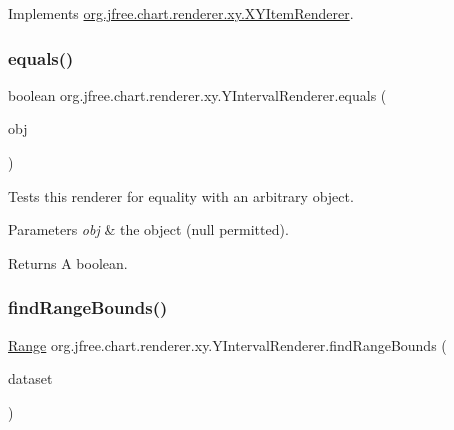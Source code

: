 Implements \mbox{\hyperlink{interfaceorg_1_1jfree_1_1chart_1_1renderer_1_1xy_1_1_x_y_item_renderer_ad867040a3ea09f5127596aacdd94586a}{org.\+jfree.\+chart.\+renderer.\+xy.\+X\+Y\+Item\+Renderer}}.

\mbox{\label{classorg_1_1jfree_1_1chart_1_1renderer_1_1xy_1_1_y_interval_renderer_ab292e22ca438b6cf0d390cb05c5f45f3}} 
\subsubsection{\texorpdfstring{equals()}{equals()}}
{\footnotesize\ttfamily boolean org.\+jfree.\+chart.\+renderer.\+xy.\+Y\+Interval\+Renderer.\+equals (\begin{DoxyParamCaption}\item[{Object}]{obj }\end{DoxyParamCaption})}

Tests this renderer for equality with an arbitrary object.


\begin{DoxyParams}{Parameters}
{\em obj} & the object ({\ttfamily null} permitted).\\
\hline
\end{DoxyParams}
\begin{DoxyReturn}{Returns}
A boolean. 
\end{DoxyReturn}
\mbox{\label{classorg_1_1jfree_1_1chart_1_1renderer_1_1xy_1_1_y_interval_renderer_a27eacc42fdc720481b38c2e69c682ba7}} 
\subsubsection{\texorpdfstring{find\+Range\+Bounds()}{findRangeBounds()}}
{\footnotesize\ttfamily \mbox{\hyperlink{classorg_1_1jfree_1_1data_1_1_range}{Range}} org.\+jfree.\+chart.\+renderer.\+xy.\+Y\+Interval\+Renderer.\+find\+Range\+Bounds (\begin{DoxyParamCaption}\item[{\mbox{\hyperlink{interfaceorg_1_1jfree_1_1data_1_1xy_1_1_x_y_dataset}{X\+Y\+Dataset}}}]{dataset }\end{DoxyParamCaption})}

